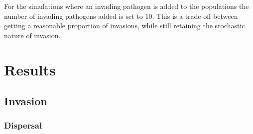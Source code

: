 

For the simulations where an invading pathogen is added to the populations the number of invading pathogens added is set to 10. 
This is a trade off between getting a reasonable proportion of invasions, while still retaining the stochastic nature of invasion.













\section{Results}









































\subsection{Invasion}


\subsubsection{Dispersal}


